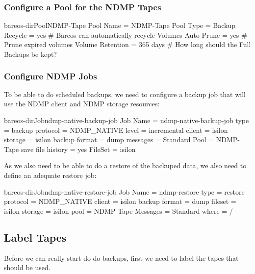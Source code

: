 \subsubsection{Configure a Pool for the NDMP Tapes}

\begin{bareosConfigResource}{bareos-dir}{Pool}{NDMP-Tape}
Pool {
  Name = NDMP-Tape
  Pool Type = Backup
  Recycle = yes                       # Bareos can automatically recycle Volumes
  Auto Prune = yes                    # Prune expired volumes
  Volume Retention = 365 days         # How long should the Full Backups be kept?
}
\end{bareosConfigResource}



\subsubsection{Configure NDMP Jobs}

To be able to do scheduled backups, we need to configure a backup job that will use the NDMP client and NDMP storage resources:

\begin{bareosConfigResource}{bareos-dir}{Job}{ndmp-native-backup-job}
Job {
   Name = ndmp-native-backup-job
   type = backup
   protocol = NDMP_NATIVE
   level = incremental
   client = isilon
   storage = isilon
   backup format = dump
   messages = Standard
   Pool = NDMP-Tape
   save file history = yes
   FileSet = isilon
}
\end{bareosConfigResource}


As we also need to be able to do a restore of the backuped data, we also need to define an adequate restore job:

\begin{bareosConfigResource}{bareos-dir}{Job}{ndmp-native-restore-job}
Job{
   Name = ndmp-restore
   type = restore
   protocol = NDMP_NATIVE
   client = isilon
   backup format = dump
   fileset = isilon
   storage  = isilon
   pool = NDMP-Tape
   Messages = Standard
   where = /
}
\end{bareosConfigResource}




\subsection{Label Tapes}

Before we can really start do do backups, first we need to label the tapes that should be used.

